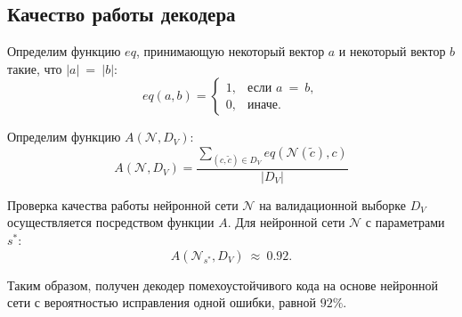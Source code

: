 \subsection{Качество работы декодера}\label{subsec:accuracy}

Определим функцию $eq$, принимающую некоторый вектор $a$ и некоторый вектор $b$ такие, что $|a|~=~|b|$:
\begin{equation}\label{eq:equal}
    eq(a, b) =
    \begin{cases}
        1, & \mbox{если } a~=~b, \\
        0, & \mbox{иначе}.
    \end{cases}
\end{equation}

Определим функцию $A(\mathcal{N}, D_V)$:
\begin{equation}\label{eq:accuracy}
    A(\mathcal{N}, D_V) = \frac{\sum_{(c, \widetilde{c})\in D_V}eq(\mathcal{N}(\widetilde{c}), c)}{|D_V|}
\end{equation}

Проверка качества работы нейронной сети $\mathcal{N}$ на валидационной выборке $D_V$ осуществляется посредством функции $A$. Для нейронной сети $\mathcal{N}$ с параметрами $s^*$:
\begin{equation}\label{eq:final_accuracy}
  A(\mathcal{N}_{s^*}, D_V)~\approx~0.92.
\end{equation}

Таким образом, получен декодер помехоустойчивого кода на основе нейронной сети с вероятностью исправления одной ошибки, равной $92 \%$.

\newpage 